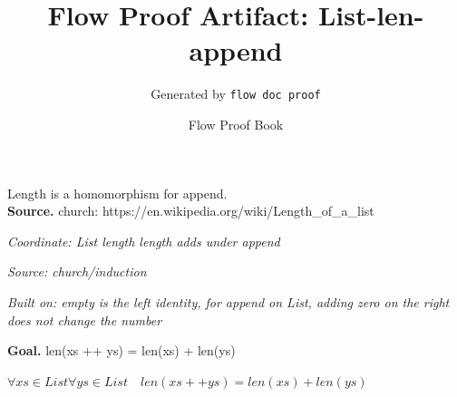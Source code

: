 \documentclass[11pt]{article}
\title{Flow Proof Artifact: List-len-append}
\author{Generated by \texttt{flow doc proof}}
\date{Flow Proof Book}
\theoremstyle{definition}
\begin{document}
\maketitle
Length is a homomorphism for append.\\[0.5em]
\textbf{Source.} church: https://en.wikipedia.org/wiki/Length\_of\_a\_list\\[0.5em]
\bigskip
{}\par
\smallskip\noindent\textit{Coordinate: List \cdot length \cdot length adds under append}\par
\smallskip\noindent\textit{Source: church/induction}\par
\smallskip\noindent\textit{Built on: empty is the left identity, for append on List, adding zero on the right does not change the number}\par
\medskip
\noindent\textbf{Goal.} len(xs ++ ys) = len(xs) + len(ys)\par
\noindent$\displaystyle \forall xs \in List \forall ys \in List\quad len(xs ++ ys) = len(xs) + len(ys)$\par
\medskip
\noindent
\end{document}
